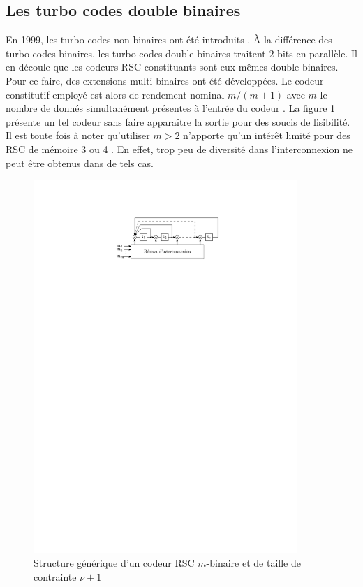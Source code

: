 \subsection{Les turbo codes double binaires}
En 1999, les turbo codes non binaires ont été introduits \cite{doublebin1}. À la différence des turbo codes binaires, les turbo codes double binaires traitent $2$ bits en parallèle. Il en découle que les codeurs RSC constituants sont eux mêmes double binaires. Pour ce faire, des extensions multi binaires ont été développées. Le codeur constitutif employé est alors de rendement nominal $m/(m+1)$ avec $m$ le nombre de donnés simultanément présentes à l'entrée du codeur \cite{doublebin3}. La figure \ref{fig:encMulti} présente un tel codeur sans faire apparaître la sortie pour des soucis de lisibilité. Il est toute fois à noter qu'utiliser $m > 2$ n'apporte qu'un intérêt limité pour des RSC de mémoire 3 ou 4 \cite{Balta2013}. En effet, trop peu de diversité dans l'interconnexion ne peut être obtenus dans de tels cas.
\begin{figure}[!h]
	\centering
	\includegraphics[width=10cm]{main/ch1_fig/encMulti.pdf}
	\caption{\label{fig:encMulti} Structure générique d'un codeur RSC $m$-binaire et de taille de contrainte $\nu +1$}
\end{figure}


